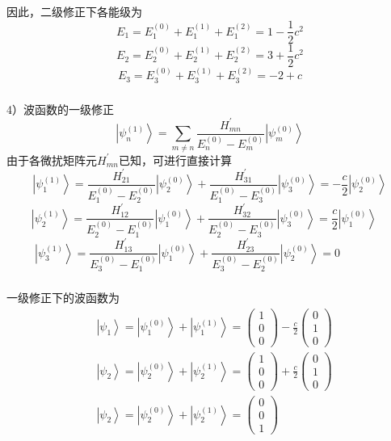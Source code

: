 \begin{frame}
  \frametitle{}
因此，二级修正下各能级为 
\[ E_1 = E^{(0)}_1 + E^{(1)}_1 + E^{(2)}_1 = 1 - \frac{1}{2}c^2 \]
\[ E_2 = E^{(0)}_2 + E^{(1)}_2 + E^{(2)}_2 = 3 + \frac{1}{2}c^2 \]
\[ E_3 = E^{(0)}_3 + E^{(1)}_3 + E^{(2)}_3 = -2 + c \]
\end{frame} 

\begin{frame}
  \frametitle{}
 4）波函数的一级修正
 $$
\left|\psi_n^{(1)}\right\rangle = \sum_{m\ne n} \frac{H^{\prime}_{mn}}{E_n^{(0)}-E_m^{(0)}} \left|\psi_m^{(0)}\right\rangle  
$$ 
由于各微扰矩阵元$H ^{\prime} _{mn}$已知，可进行直接计算
$$
\left|\psi_1^{(1)}\right\rangle = \frac{H^{\prime}_{21}}{E_1^{(0)}-E_2^{(0)}} \left|\psi_2^{(0)}\right\rangle + \frac{H^{\prime}_{31}}{E_1^{(0)}-E_3^{(0)}} \left|\psi_3^{(0)}\right\rangle  = -\frac{c}{2} \left|\psi_2^{(0)}\right\rangle  
$$ 
$$
\left|\psi_2^{(1)}\right\rangle = \frac{H^{\prime}_{12}}{E_2^{(0)}-E_1^{(0)}} \left|\psi_1^{(0)}\right\rangle + \frac{H^{\prime}_{32}}{E_2^{(0)}-E_3^{(0)}} \left|\psi_3^{(0)}\right\rangle  = \frac{c}{2} \left|\psi_1^{(0)}  \right\rangle  \quad 
$$ 
$$
\left|\psi_3^{(1)}\right\rangle = \frac{H^{\prime}_{13}}{E_3^{(0)}-E_1^{(0)}} \left|\psi_1^{(0)}\right\rangle + \frac{H^{\prime}_{23}}{E_3^{(0)}-E_2^{(0)}} \left|\psi_2^{(0)}\right\rangle  = 0 \qquad \qquad 
$$ 
\end{frame} 

\begin{frame}
  \frametitle{}
  一级修正下的波函数为
  $$ \begin{aligned}
    &\left|\psi_1 \right\rangle = \left|\psi_1^{(0)}\right\rangle + \left|\psi_1^{(1)}\right\rangle  =  \begin{pmatrix}
      1  \\
      0  \\
      0  
    \end{pmatrix}  -\frac{c}{2}  \begin{pmatrix}
      0  \\
      1  \\
      0  
    \end{pmatrix} \\
    &\left|\psi_2 \right\rangle = \left|\psi_2^{(0)}\right\rangle + \left|\psi_2^{(1)}\right\rangle  =  \begin{pmatrix}
      1  \\
      0  \\
      0  
    \end{pmatrix}  + \frac{c}{2}  \begin{pmatrix}
      0  \\
      1  \\
      0  
    \end{pmatrix} \\
    &\left|\psi_2 \right\rangle = \left|\psi_2^{(0)}\right\rangle + \left|\psi_2^{(1)}\right\rangle  =  \begin{pmatrix}
      0  \\
      0  \\
      1  
    \end{pmatrix}
  \end{aligned}$$
\end{frame} 

